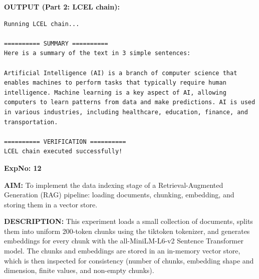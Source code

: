 \documentclass[10pt,a4paper]{article}
\newcommand{\code}[1]{{\ttfamily\hyphenchar\font=-1 #1}}
\newcommand{\sectionlabel}[1]{\par\vspace{3pt}\noindent\textbf{#1}\par\nopagebreak}
\begin{document}
\sectionlabel{OUTPUT (Part 2: LCEL chain):}
\begin{lstlisting}[style=output]
Running LCEL chain...

========== SUMMARY ==========
Here is a summary of the text in 3 simple sentences:

Artificial Intelligence (AI) is a branch of computer science that enables machines to perform tasks that typically require human intelligence. Machine learning is a key aspect of AI, allowing computers to learn patterns from data and make predictions. AI is used in various industries, including healthcare, education, finance, and transportation.

========== VERIFICATION ==========
LCEL chain executed successfully!
\end{lstlisting}


\clearpage

\noindent\textbf{ExpNo: 12}

\noindent\textbf{AIM:} To implement the data indexing stage of a Retrieval-Augmented Generation (RAG) pipeline: loading documents, chunking, embedding, and storing them in a vector store.

\noindent\textbf{DESCRIPTION:} This experiment loads a small collection of documents, splits them into uniform 200-token chunks using the \code{tiktoken} tokenizer, and generates embeddings for every chunk with the \code{all{-}\allowbreak{}MiniLM{-}\allowbreak{}L6{-}\allowbreak{}v2} Sentence Transformer model. The chunks and embeddings are stored in an in-memory vector store, which is then inspected for consistency (number of chunks, embedding shape and dimension, finite values, and non-empty chunks).
\end{document}
